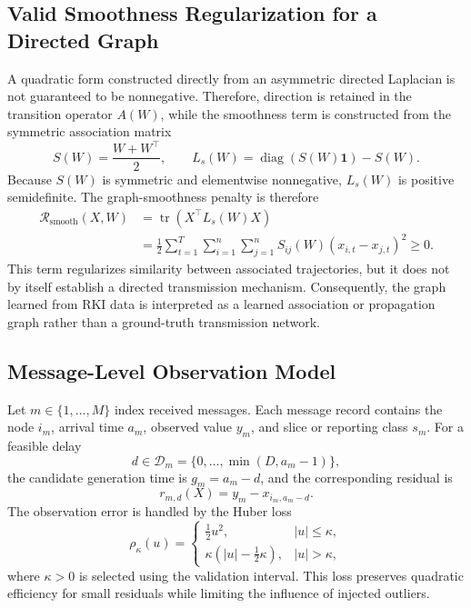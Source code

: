\subsection{Valid Smoothness Regularization for a Directed Graph}
\label{subsec:valid_smoothness}
A quadratic form constructed directly from an asymmetric directed Laplacian is not guaranteed to be nonnegative. Therefore, direction is retained in the transition operator $A(W)$, while the smoothness term is constructed from the symmetric association matrix
\begin{equation}
    S(W)=\frac{W+W^{\top}}{2},
    \qquad
    L_s(W)=\operatorname{diag}(S(W)\mathbf{1})-S(W).
    \label{eq:symmetric_laplacian_new}
\end{equation}
Because $S(W)$ is symmetric and elementwise nonnegative, $L_s(W)$ is positive semidefinite. The graph-smoothness penalty is therefore
\begin{align}
    \mathcal{R}_{\mathrm{smooth}}(X,W)
    &=\operatorname{tr}\!\left(X^{\top}L_s(W)X\right) \nonumber\\
    &=\frac{1}{2}\sum_{t=1}^{T}\sum_{i=1}^{n}\sum_{j=1}^{n}
    S_{ij}(W)\left(x_{i,t}-x_{j,t}\right)^2
    \geq 0.
    \label{eq:valid_smoothness_new}
\end{align}
This term regularizes similarity between associated trajectories, but it does not by itself establish a directed transmission mechanism. Consequently, the graph learned from RKI data is interpreted as a learned association or propagation graph rather than a ground-truth transmission network.

\subsection{Message-Level Observation Model}
\label{subsec:message_observation}
Let $m\in\{1,\ldots,M\}$ index received messages. Each message record contains the node $i_m$, arrival time $a_m$, observed value $y_m$, and slice or reporting class $s_m$. For a feasible delay
\begin{equation}
    d\in\mathcal{D}_m
    =\{0,\ldots,\min(D,a_m-1)\},
    \label{eq:feasible_delays_new}
\end{equation}
the candidate generation time is $g_m=a_m-d$, and the corresponding residual is
\begin{equation}
    r_{m,d}(X)=y_m-x_{i_m,a_m-d}.
    \label{eq:message_residual_new}
\end{equation}
The observation error is handled by the Huber loss
\begin{equation}
    \rho_{\kappa}(u)=
    \begin{cases}
        \frac{1}{2}u^2, & |u|\leq\kappa,\\
        \kappa\left(|u|-\frac{1}{2}\kappa\right), & |u|>\kappa,
    \end{cases}
    \label{eq:huber_loss_new}
\end{equation}
where $\kappa>0$ is selected using the validation interval. This loss preserves quadratic efficiency for small residuals while limiting the influence of injected outliers.

